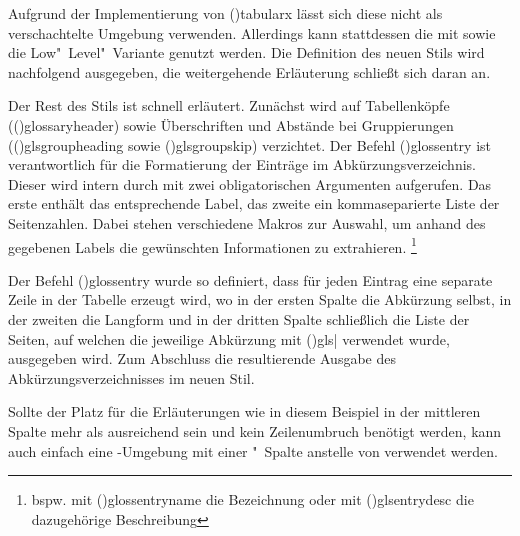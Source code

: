 \documentclass[%
  english,ngerman,%
  cdgeometry=no,DIV=12,%
  cd=false,cdfont=false,cdtitle=true,%
  headings=normal,%
  automark,%
  listof=toc,%
]{tudscrartcl}
\begin{document}
Aufgrund der Implementierung von \Environment(){tabularx} 
lässt sich diese nicht als verschachtelte Umgebung verwenden. Allerdings kann 
stattdessen die mit  sowie  die 
Low"~Level"~Variante genutzt werden. Die Definition des neuen Stils 
 wird nachfolgend ausgegeben, die weitergehende 
Erläuterung schließt sich daran an.
%
\CodeHook{\let\newglossarystyle\renewglossarystyle}
\begin{Hint*}

\end{Hint*}
%
Der Rest des Stils ist schnell erläutert. Zunächst wird auf Tabellenköpfe 
(\Macro(){glossaryheader}) sowie Überschriften und Abstände 
bei Gruppierungen (\Macro(){glsgroupheading} sowie 
\Macro(){glsgroupskip}) verzichtet. Der Befehl 
\Macro(){glossentry} ist verantwortlich für die 
Formatierung der Einträge im Abkürzungsverzeichnis. Dieser wird intern durch 
 mit zwei obligatorischen Argumenten aufgerufen. Das erste 
enthält das entsprechende Label, das zweite ein kommaseparierte Liste der 
Seitenzahlen. Dabei stehen verschiedene Makros zur Auswahl, um anhand des 
gegebenen Labels die gewünschten Informationen zu extrahieren.%
\footnote{%
  bspw. mit \Macro(){glossentryname} die Bezeichnung oder 
  mit \Macro(){glsentrydesc} die dazugehörige Beschreibung%
}

Der Befehl \Macro(){glossentry} wurde so definiert, dass 
für jeden Eintrag eine separate Zeile in der Tabelle erzeugt wird, wo in der 
ersten Spalte die Abkürzung selbst, in der zweiten die Langform und in der 
dritten Spalte schließlich die Liste der Seiten, auf welchen die jeweilige 
Abkürzung mit \Macro(){gls|} verwendet 
wurde, ausgegeben wird. Zum Abschluss die resultierende Ausgabe des 
Abkürzungsverzeichnisses im neuen Stil.
%
\begin{Hint}
\printacronyms[style=acrotabularx]
\end{Hint}
\begin{quoting}[rightmargin=0pt]
\InputCode
\end{quoting}
%
Sollte der Platz für die Erläuterungen wie in diesem Beispiel in der mittleren 
Spalte mehr als ausreichend sein und kein Zeilenumbruch benötigt werden, kann 
auch einfach eine -Umgebung mit einer "~Spalte 
anstelle von  verwendet werden.
\end{document}
